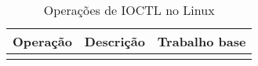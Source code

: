 \begin{table}[]
\centering
\begin{tabular}{|l|l|l|}
  \hline
  \textbf{Operação} & \textbf{Descrição} & \textbf{Trabalho base} \\ \hline
  \multicolumn{1}{|c|}{} & \multicolumn{1}{c|}{} &               \\ \hline
\end{tabular}
\caption{Operações de IOCTL no Linux}
\label{tab:ops_atomize_linux}
\end{table}
